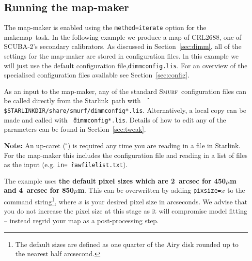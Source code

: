 \documentclass[twoside,11pt]{article}
\newcommand{\htmladdnormallink}[2]{#1}
\newcommand{\xref}[3]{#1}
\newcommand{\xlabel}[1]{}
\renewcommand{\_}{\texttt{\symbol{95}}}
\newcommand{\starlink}{\htmladdnormallink{Starlink}{http://starlink.jach.hawaii.edu}}
\newcommand{\smurf}{\xref{\textsc{Smurf}}{sun258}{}}
\newcommand{\task}[1]{\textsf{#1}}
\newcommand{\makemap}{\xref{\task{makemap}}{sun258}{MAKEMAP}}
\begin{document}
\subsection{\xlabel{running_dimm}Running the map-maker}

The map-maker is enabled using the \texttt{method=iterate} option for the
\makemap\ task. In the following example we produce a map of CRL2688,
one of SCUBA-2's secondary calibrators. As discussed in
Section~\ref{sec:dimm}, all of the settings for the map-maker are
stored in configuration files.  In this example we will just use the
default configuration file,\texttt{dimmconfig.lis}. For an overview of
the specialised configuration files available see
Section~\ref{sec:config}.

As an input to the map-maker, any of the standard \smurf\
configuration files can be called directly from the \starlink\ path
with \texttt{\^\,\$STARLINK\_DIR/share/smurf/dimmconfig*.lis}.
Alternatively, a local copy can be made and called with
\texttt{\^\,dimmconfig*.lis}. Details of how to edit any of the
parameters can be found in Section~\ref{sec:tweak}.

\textbf{Note:} An up-caret (\,\^\,) is required any time you are reading in
a file in \starlink. For the map-maker this includes the configuration
file and reading in a list of files as the input (e.g.
\texttt{in=\^\,rawfilelist.txt}).

The example uses \textbf{the
default pixel sizes which are 2~arcsec for 450$\mu$m and 4~arcsec for
850$\mu$m}. This can be overwritten by adding \texttt{pixsize=}$x$ to the
command string\footnote{The default sizes are defined as one quarter
of the Airy disk rounded up to the nearest half arcsecond.}, where $x$
is your desired pixel size in arcseconds. We advise that you do not
increase the pixel size at this stage as it will compromise model
fitting -- instead regrid your map as a post-processing step.
\end{document}
